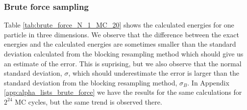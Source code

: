 
 \subsubsection{Brute force sampling}
 
Table \ref{tab:brute_force_N_1_MC_20} shows the calculated energies for one particle in three dimensions. We observe that the difference between the exact energies and the calculated energies are sometimes smaller than the standard deviation calculated from the blocking resampling method which should give us an estimate of the error. This is suprising, but we also observe that the normal standard deviation, $\sigma$, which should underestimate the error is larger than the standard deviation from the blocking resampling method, $\sigma_B$. In Appendix \ref{app:alpha_lists_brute_force} we have the results for the same calculations for $2^{24}$ MC cycles, but the same trend is observed there.

